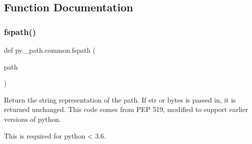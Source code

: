 \subsection{Function Documentation}
\mbox{\label{namespacepy_1_1__path_1_1common_abf82f227c254ea6c218bf3be0fec8a02}} 
\subsubsection{\texorpdfstring{fspath()}{fspath()}}
{\footnotesize\ttfamily def py.\+\_\+path.\+common.\+fspath (\begin{DoxyParamCaption}\item[{}]{path }\end{DoxyParamCaption})}

\begin{DoxyVerb}Return the string representation of the path.
If str or bytes is passed in, it is returned unchanged.
This code comes from PEP 519, modified to support earlier versions of
python.

This is required for python < 3.6.
\end{DoxyVerb}
 